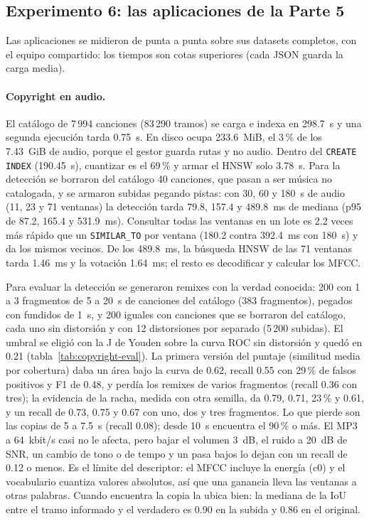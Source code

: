 \FloatBarrier
\subsection{Experimento 6: las aplicaciones de la Parte 5}

Las aplicaciones se midieron de punta a punta sobre sus datasets completos, con el equipo
compartido: los tiempos son cotas superiores (cada JSON guarda la carga media).

\paragraph{Copyright en audio.} El catálogo de 7\,994 canciones (83\,290 tramos) se carga e
indexa en 298.7~s y una segunda ejecución tarda 0.75~s. En disco ocupa 233.6~MiB, el 3\,\%
de los 7.43~GiB de audio, porque el gestor guarda rutas y no audio. Dentro del
\texttt{CREATE INDEX} (190.45~s), cuantizar es el 69\,\% y armar el HNSW solo 3.78~s. Para la
detección se borraron del catálogo 40 canciones, que pasan a ser música no catalogada, y se
armaron subidas pegando pistas: con 30, 60 y 180~s de audio (11, 23 y 71 ventanas) la
detección tarda 79.8, 157.4 y 489.8~ms de mediana (p95 de 87.2, 165.4 y 531.9~ms). Consultar todas las
ventanas en un lote es 2.2 veces más rápido que un \texttt{SIMILAR\_TO} por ventana (180.2
contra 392.4~ms con 180~s) y da los mismos vecinos. De los 489.8~ms, la búsqueda HNSW de las
71 ventanas tarda 1.46~ms y la votación 1.64~ms; el resto es decodificar y calcular los MFCC.

Para evaluar la detección se generaron remixes con la verdad conocida: 200 con 1 a 3
fragmentos de 5 a 20~s de canciones del catálogo (383 fragmentos), pegados con fundidos de
1~s, y 200 iguales con canciones que se borraron del catálogo, cada uno sin distorsión y con
12 distorsiones por separado (5\,200 subidas). El umbral se eligió con la J de Youden sobre la
curva ROC sin distorsión y quedó en 0.21 (tabla~\ref{tab:copyright-eval}). La primera versión
del puntaje (similitud media por cobertura) daba un área bajo la curva de 0.62, recall 0.55
con 29\,\% de falsos positivos y F1 de 0.48, y perdía los remixes de varios fragmentos (recall
0.36 con tres); la evidencia de la racha, medida con otra semilla, da 0.79, 0.71, 23\,\% y 0.61,
y un recall de 0.73, 0.75 y 0.67 con uno, dos y tres fragmentos. Lo que pierde son las copias
de 5 a 7.5~s (recall 0.08); desde 10~s encuentra el 90\,\% o más. El MP3 a 64~kbit/s casi no
le afecta, pero bajar el volumen 3~dB, el ruido a 20~dB de SNR, un cambio de tono o de tempo y
un pasa bajos lo dejan con un recall de 0.12 o menos. Es el límite del descriptor: el MFCC
incluye la energía (c0) y el vocabulario cuantiza valores absolutos, así que una ganancia
lleva las ventanas a otras palabras. Cuando encuentra la copia la ubica bien: la mediana de la
IoU entre el tramo informado y el verdadero es 0.90 en la subida y 0.86 en el original.

